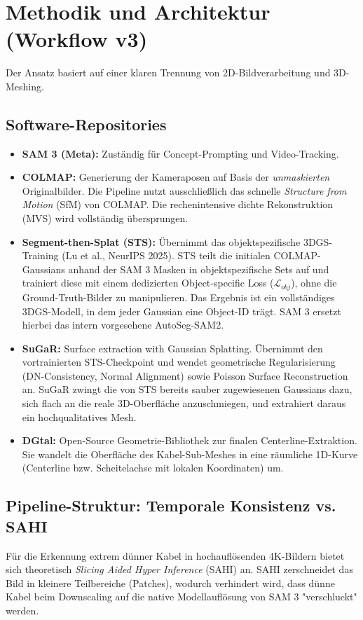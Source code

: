 \documentclass[12pt,a4paper]{article}
\begin{document}
\section{Methodik und Architektur (Workflow v3)}
Der Ansatz basiert auf einer klaren Trennung von 2D-Bildverarbeitung und 3D-Meshing.

\subsection{Software-Repositories}
\begin{itemize}
    \item \textbf{SAM 3 (Meta):} Zuständig für Concept-Prompting und Video-Tracking.
    \item \textbf{COLMAP:} Generierung der Kameraposen auf Basis der \textit{unmaskierten} Originalbilder. Die Pipeline nutzt ausschließlich das schnelle \textit{Structure from Motion} (SfM) von COLMAP. Die rechenintensive dichte Rekonstruktion (MVS) wird vollständig übersprungen.
    \item \textbf{Segment-then-Splat (STS):} Übernimmt das objektspezifische 3DGS-Training (Lu et al., NeurIPS 2025). STS teilt die initialen COLMAP-Gaussians anhand der SAM 3 Masken in objektspezifische Sets auf und trainiert diese mit einem dedizierten Object-specific Loss ($\mathcal{L}_{obj}$), ohne die Ground-Truth-Bilder zu manipulieren. Das Ergebnis ist ein vollständiges 3DGS-Modell, in dem jeder Gaussian eine Object-ID trägt. SAM 3 ersetzt hierbei das intern vorgesehene AutoSeg-SAM2.
    \item \textbf{SuGaR:} Surface extraction with Gaussian Splatting. Übernimmt den vortrainierten STS-Checkpoint und wendet geometrische Regularisierung (DN-Consistency, Normal Alignment) sowie Poisson Surface Reconstruction an. SuGaR zwingt die von STS bereits sauber zugewiesenen Gaussians dazu, sich flach an die reale 3D-Oberfläche anzuschmiegen, und extrahiert daraus ein hochqualitatives Mesh.
    \item \textbf{DGtal:} Open-Source Geometrie-Bibliothek zur finalen Centerline-Extraktion. Sie wandelt die Oberfläche des Kabel-Sub-Meshes in eine räumliche 1D-Kurve (Centerline bzw. Scheitelachse mit lokalen Koordinaten) um.
\end{itemize}

\subsection{Pipeline-Struktur: Temporale Konsistenz vs. SAHI}
Für die Erkennung extrem dünner Kabel in hochauflösenden 4K-Bildern bietet sich theoretisch \textit{Slicing Aided Hyper Inference} (SAHI) an. SAHI zerschneidet das Bild in kleinere Teilbereiche (Patches), wodurch verhindert wird, dass dünne Kabel beim Downscaling auf die native Modellauflösung von SAM 3 "verschluckt" werden.
\end{document}
